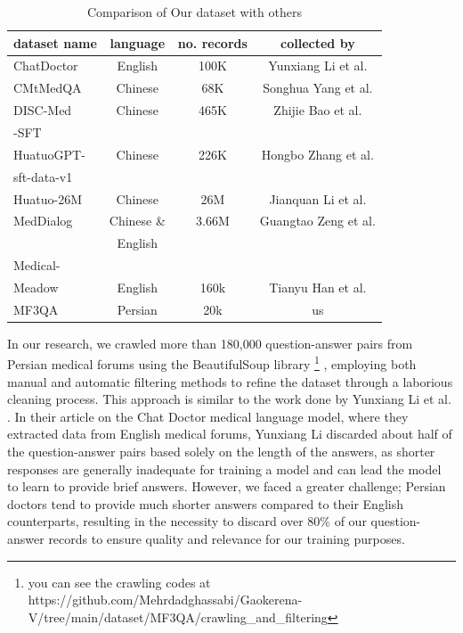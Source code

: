\documentclass[conference]{IEEEtran}
\begin{document}
	\begin{table}[ht]
		\centering
		\caption{Comparison of Our dataset with others}
		\begin{tabular}{|l|c|c|c|}  %
			\hline
			dataset name            &language & no. records & collected by \\ \hline
			ChatDoctor 	   &English	 & 100K        & Yunxiang Li et al.
			\cite{b7}
			\\ \hline
			CMtMedQA  	   &Chinese	 & 68K        &  Songhua Yang et al.
			\cite{b22}
			\\ \hline
			DISC-Med	   &Chinese	 & 465K       & Zhijie Bao et al.   
			\cite{b23}
			\\ 
			-SFT       & &  &  \\ \hline
			HuatuoGPT-	   &Chinese	 & 226K        & Hongbo Zhang et al.   
			\cite{b24}
			\\ 
			sft-data-v1	   &	     &             & 	\\ \hline
			Huatuo-26M	   &Chinese	 & 26M         & Jianquan Li et al.
			\cite{b25}
			\\ \hline
			MedDialog       &Chinese \&&3.66M       & Guangtao Zeng et al.  \\ 
			&English  &             &  \cite{b26} \\ \hline
			Medical-       & &  &  \\
			Meadow  &English  & 160k        & Tianyu Han et al. 
			\cite{b27}
			\\ \hline
			MF3QA           &Persian  & 20k            & us \\ \hline
		\end{tabular}
		\label{tab:mf3qa_comparisin}
	\end{table}
	
In our research, we crawled more than 180,000 question-answer pairs from Persian medical forums using the BeautifulSoup library
\footnote{you can see the crawling codes at https://github.com/Mehrdadghassabi/Gaokerena-V/tree/main/dataset/MF3QA/crawling\_and\_filtering}
, employing both manual and automatic filtering methods to refine the dataset through a laborious cleaning process. This approach is similar to the work done by Yunxiang Li et al. \cite{b7}. In their article on the Chat Doctor medical language model, where they extracted data from English medical forums, Yunxiang Li discarded about half of the question-answer pairs based solely on the length of the answers, as shorter responses are generally inadequate for training a model and can lead the model to learn to provide brief answers. However, we faced a greater challenge; Persian doctors tend to provide much shorter answers compared to their English counterparts, resulting in the necessity to discard over 80\% of our question-answer records to ensure quality and relevance for our training purposes.
\end{document}
